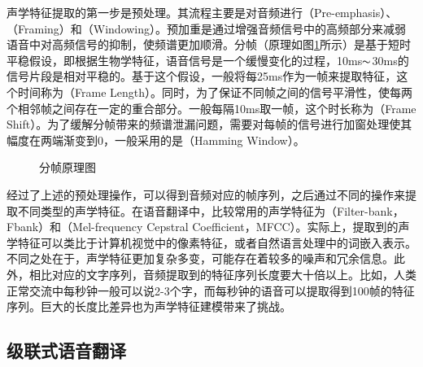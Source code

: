 \parinterval 声学特征提取的第一步是预处理。其流程主要是对音频进行{\small{}}（Pre-emphasis）、{\small{}}（Framing）和{\small{}}（Windowing）。预加重是通过增强音频信号中的高频部分来减弱语音中对高频信号的抑制，使频谱更加顺滑。分帧（原理如图\ref{fig:17-3}所示）是基于短时平稳假设，即根据生物学特征，语音信号是一个缓慢变化的过程，10ms$\thicksim$30ms的信号片段是相对平稳的。基于这个假设，一般将每25ms作为一帧来提取特征，这个时间称为{\small{}}（Frame Length）。同时，为了保证不同帧之间的信号平滑性，使每两个相邻帧之间存在一定的重合部分。一般每隔10ms取一帧，这个时长称为{\small{}}（Frame Shift）。为了缓解分帧带来的频谱泄漏问题，需要对每帧的信号进行加窗处理使其幅度在两端渐变到0，一般采用的是{\small{}}（Hamming Window）。
\begin{figure}[htp]
\centering

\caption{分帧原理图}
\label{fig:17-3}
\end{figure}

\parinterval 经过了上述的预处理操作，可以得到音频对应的帧序列，之后通过不同的操作来提取不同类型的声学特征。在语音翻译中，比较常用的声学特征为{\small{}}（Filter-bank，Fbank）和{\small{}}（Mel-frequency Cepstral Coefficient，MFCC）。实际上，提取到的声学特征可以类比于计算机视觉中的像素特征，或者自然语言处理中的词嵌入表示。不同之处在于，声学特征更加复杂多变，可能存在着较多的噪声和冗余信息。此外，相比对应的文字序列，音频提取到的特征序列长度要大十倍以上。比如，人类正常交流中每秒钟一般可以说2-3个字，而每秒钟的语音可以提取得到100帧的特征序列。巨大的长度比差异也为声学特征建模带来了挑战。


\subsection{级联式语音翻译}
\label{sec:cascaded-speech-translation}

